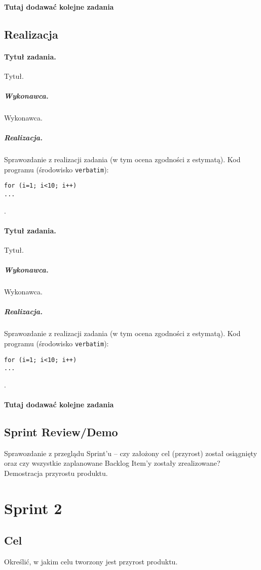 \documentclass[a4paper]{article}
\begin{document}
\paragraph{Tutaj dodawać kolejne zadania}

\subsection{Realizacja}

\paragraph{Tytuł zadania.} Tytuł.
\subparagraph{Wykonawca.} Wykonawca.
\subparagraph{Realizacja.} Sprawozdanie z realizacji zadania (w tym ocena zgodności z estymatą). Kod programu (środowisko \texttt{verbatim}): \begin{verbatim}
for (i=1; i<10; i++)
...
\end{verbatim}.

\paragraph{Tytuł zadania.} Tytuł.
\subparagraph{Wykonawca.} Wykonawca.
\subparagraph{Realizacja.} Sprawozdanie z realizacji zadania (w tym ocena zgodności z estymatą). Kod programu (środowisko \texttt{verbatim}): \begin{verbatim}
for (i=1; i<10; i++)
...
\end{verbatim}.

\paragraph{Tutaj dodawać kolejne zadania}


\subsection{Sprint Review/Demo}
Sprawozdanie z przeglądu Sprint'u -- czy założony cel (przyrost) został osiągnięty oraz czy wszystkie zaplanowane Backlog Item'y zostały zrealizowane? Demostracja przyrostu produktu.

\section{Sprint 2}

\subsection{Cel} Określić, w jakim celu tworzony jest przyrost produktu.
\end{document}
